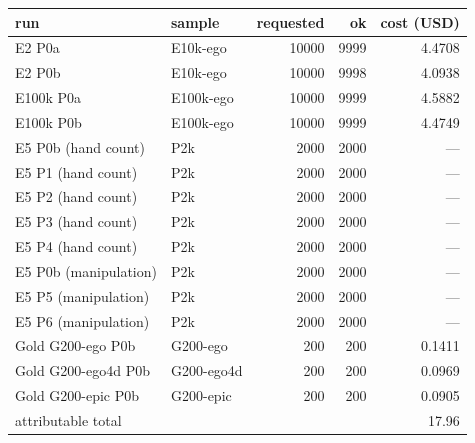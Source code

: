 \begin{tabular}{@{}llrrr@{}}
\toprule
run & sample & requested & ok & cost (USD) \\
\midrule
E2 P0a & E10k-ego & 10000 & 9999 & 4.4708 \\
E2 P0b & E10k-ego & 10000 & 9998 & 4.0938 \\
E100k P0a & E100k-ego & 10000 & 9999 & 4.5882 \\
E100k P0b & E100k-ego & 10000 & 9999 & 4.4749 \\
E5 P0b (hand count) & P2k & 2000 & 2000 & --- \\
E5 P1 (hand count) & P2k & 2000 & 2000 & --- \\
E5 P2 (hand count) & P2k & 2000 & 2000 & --- \\
E5 P3 (hand count) & P2k & 2000 & 2000 & --- \\
E5 P4 (hand count) & P2k & 2000 & 2000 & --- \\
E5 P0b (manipulation) & P2k & 2000 & 2000 & --- \\
E5 P5 (manipulation) & P2k & 2000 & 2000 & --- \\
E5 P6 (manipulation) & P2k & 2000 & 2000 & --- \\
Gold G200-ego P0b & G200-ego & 200 & 200 & 0.1411 \\
Gold G200-ego4d P0b & G200-ego4d & 200 & 200 & 0.0969 \\
Gold G200-epic P0b & G200-epic & 200 & 200 & 0.0905 \\
\midrule
\multicolumn{4}{l}{attributable total} & 17.96 \\
\bottomrule
\end{tabular}
